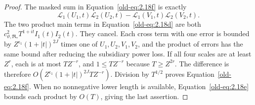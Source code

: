 \documentclass[12pt]{article}
\begin{document}
\begin{proof}
The masked sum in Equation~\eqref{old-eq:2.18f} is exactly
\[
 \mathcal L_1(U_1,t)\mathcal L_2(U_2,t)
 -\mathcal L_1(V_1,t)\mathcal L_2(V_2,t).
\]
The two product main terms in
Equation~\eqref{old-eq:2.18d} are both
\(c_{\vartheta,\mathfrak R_*}^2T^{1+it}I_1(t)I_2(t)\).
They cancel.  Each cross term with one error is bounded by
\(Z^{\epsilon_1}(1+|t|)^{2J}\) times one of
\(U_1,U_2,V_1,V_2\), and the product of errors has the same
bound after reducing the subsidiary power loss.  If all four
scales are at least \(Z^r\), each is at most \(TZ^{-r}\),
and \(1\le TZ^{-r}\) because \(T\ge Z^{2r}\).
The difference is therefore
\(O(Z^{\epsilon_1}(1+|t|)^{2J}TZ^{-r})\).
Division by \(T^{1/2}\) proves
Equation~\eqref{old-eq:2.18f}.  When no nonnegative lower length
is available, Equation~\eqref{old-eq:2.18e} bounds each product
by \(O(T)\), giving the last assertion.
\end{proof}
\end{document}
